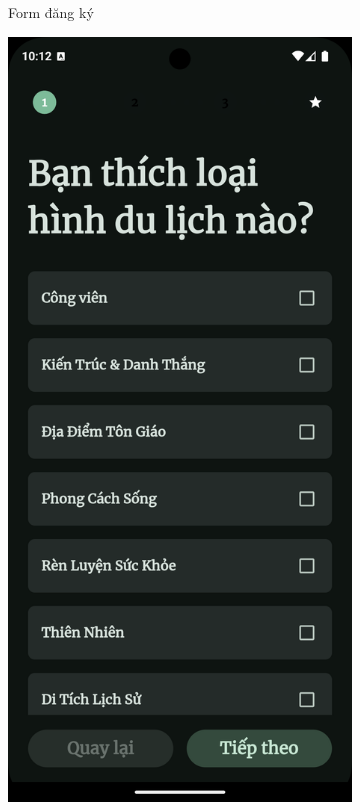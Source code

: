 \begin{figure}[H]
\begin{subfigure}{0.326\textwidth}
        \caption{Form đăng ký}
        \label{fig:func_sign_up}
    \end{subfigure}
    \hfill
    \begin{subfigure}{0.326\textwidth}
        \includegraphics[width=1\linewidth]{figures/c4/system_func/pref.png}

\end{subfigure}
\end{figure}
